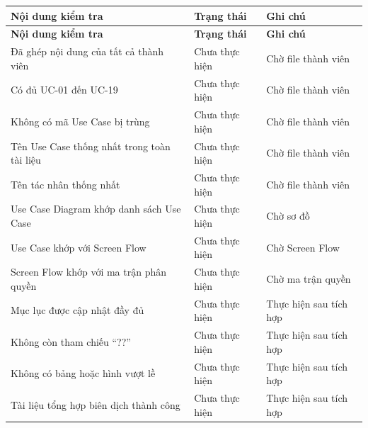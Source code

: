 \documentclass[12pt,a4paper]{article}
\begin{document}
	\begin{longtable}{
			|p{9.5cm}
			|>{\centering\arraybackslash}p{2.3cm}
			|p{2.5cm}|
		}
		\hline
		\textbf{Nội dung kiểm tra} &
		\textbf{Trạng thái} &
		\textbf{Ghi chú} \\
		\hline
		\endfirsthead
		
		\hline
		\textbf{Nội dung kiểm tra} &
		\textbf{Trạng thái} &
		\textbf{Ghi chú} \\
		\hline
		\endhead
		
		Đã ghép nội dung của tất cả thành viên &
		Chưa thực hiện &
		Chờ file thành viên \\
		\hline
		
		Có đủ UC-01 đến UC-19 &
		Chưa thực hiện &
		Chờ file thành viên \\
		\hline
		
		Không có mã Use Case bị trùng &
		Chưa thực hiện &
		Chờ file thành viên \\
		\hline
		
		Tên Use Case thống nhất trong toàn tài liệu &
		Chưa thực hiện &
		Chờ file thành viên \\
		\hline
		
		Tên tác nhân thống nhất &
		Chưa thực hiện &
		Chờ file thành viên \\
		\hline
		
		Use Case Diagram khớp danh sách Use Case &
		Chưa thực hiện &
		Chờ sơ đồ \\
		\hline
		
		Use Case khớp với Screen Flow &
		Chưa thực hiện &
		Chờ Screen Flow \\
		\hline
		
		Screen Flow khớp với ma trận phân quyền &
		Chưa thực hiện &
		Chờ ma trận quyền \\
		\hline
		
		Mục lục được cập nhật đầy đủ &
		Chưa thực hiện &
		Thực hiện sau tích hợp \\
		\hline
		
		Không còn tham chiếu ``??'' &
		Chưa thực hiện &
		Thực hiện sau tích hợp \\
		\hline
		
		Không có bảng hoặc hình vượt lề &
		Chưa thực hiện &
		Thực hiện sau tích hợp \\
		\hline
		
		Tài liệu tổng hợp biên dịch thành công &
		Chưa thực hiện &
		Thực hiện sau tích hợp \\
		\hline
		
	\end{longtable}
	
\end{document}
